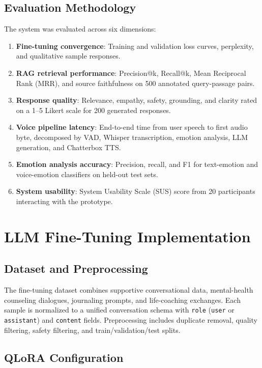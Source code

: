 \documentclass[12pt,a4paper,oneside,openany]{report}
\begin{document}
\subsection{Evaluation Methodology}

The system was evaluated across six dimensions:
\begin{enumerate}[nosep]
\item \textbf{Fine-tuning convergence}: Training and validation loss curves, perplexity, and qualitative sample responses.
\item \textbf{RAG retrieval performance}: Precision@k, Recall@k, Mean Reciprocal Rank (MRR), and source faithfulness on 500 annotated query-passage pairs.
\item \textbf{Response quality}: Relevance, empathy, safety, grounding, and clarity rated on a 1--5 Likert scale for 200 generated responses.
\item \textbf{Voice pipeline latency}: End-to-end time from user speech to first audio byte, decomposed by VAD, Whisper transcription, emotion analysis, LLM generation, and Chatterbox TTS.
\item \textbf{Emotion analysis accuracy}: Precision, recall, and F1 for text-emotion and voice-emotion classifiers on held-out test sets.
\item \textbf{System usability}: System Usability Scale (SUS) score from 20 participants interacting with the prototype.
\end{enumerate}

\section{LLM Fine-Tuning Implementation}

\subsection{Dataset and Preprocessing}

The fine-tuning dataset combines supportive conversational data, mental-health counseling dialogues, journaling prompts, and life-coaching exchanges. Each sample is normalized to a unified conversation schema with \texttt{role} (\texttt{user} or \texttt{assistant}) and \texttt{content} fields. Preprocessing includes duplicate removal, quality filtering, safety filtering, and train/validation/test splits.

\subsection{QLoRA Configuration}
\end{document}
